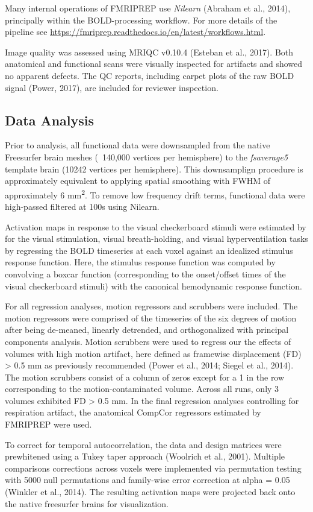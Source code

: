 \documentclass[9pt]{NEU502b-fmri}
\begin{document}
Many internal operations of FMRIPREP use \textit{Nilearn} (Abraham et al., 2014), principally within the BOLD-processing workflow. For more details of the pipeline see \href{https://fmriprep.readthedocs.io/en/latest/workflows.html}{https://fmriprep.readthedocs.io/en/latest/workflows.html}.

Image quality was assessed using MRIQC v0.10.4 (Esteban et al., 2017). Both anatomical and functional scans were visually inspected for artifacts and showed no apparent defects. The QC reports, including carpet plots of the raw BOLD signal (Power, 2017), are included for reviewer inspection.

\subsection{Data Analysis}
Prior to analysis, all functional data were downsampled from the native Freesurfer brain meshes (~140,000 vertices per hemisphere) to the \textit{fsaverage5} template brain (10242 vertices per hemisphere). This downsamplign procedure is approximately equivalent to applying spatial smoothing with FWHM of approximately 6 mm\textsuperscript{2}. To remove low frequency drift terms, functional data were high-passed filtered at 100s using Nilearn.

Activation maps in response to the visual checkerboard stimuli were estimated by for the visual stimulation, visual breath-holding, and visual hyperventilation tasks by regressing the BOLD timeseries at each voxel against an idealized stimulus response function. Here, the stimulus response function was computed by convolving a boxcar function (corresponding to the onset/offset times of the visual checkerboard stimuli) with the canonical hemodynamic response function. 

For all regression analyses, motion regressors and scrubbers were included. The motion regressors were comprised of the timeseries of the six degrees of motion after being de-meaned, linearly detrended, and orthogonalized with principal components analysis. Motion scrubbers were used to regress our the effects of volumes with high motion artifact, here defined as framewise displacement (FD) > 0.5 mm as previously recommended (Power et al., 2014; Siegel et al., 2014). The motion scrubbers consist of a column of zeros except for a 1 in the row corresponding to the motion-contaminated volume. Across all runs, only 3 volumes exhibited FD > 0.5 mm. In the final regression analyses controlling for respiration artifact, the anatomical CompCor regressors estimated by FMRIPREP were used.

To correct for temporal autocorrelation, the data and design matrices were prewhitened using a Tukey taper approach (Woolrich et al., 2001). Multiple comparisons corrections across voxels were implemented via permutation testing with 5000 null permutations and family-wise error correction at alpha = 0.05 (Winkler et al., 2014). The resulting activation maps were projected back onto the native freesurfer brains for visualization. 

\nocite{*} %

\end{document}
